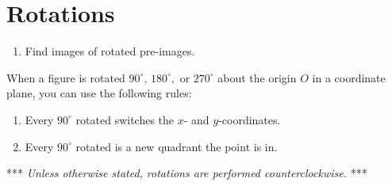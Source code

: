 \documentclass{article}
\begin{document}
\section*{Rotations}

\begin{tcolorbox}[colframe=orange!70!white, coltitle=black, title=\textbf{Today I Can}]
\begin{enumerate}
    \item Find images of rotated pre-images.
\end{enumerate}
\end{tcolorbox}
\bigskip

When a figure is rotated $90^\circ, \, 180^\circ, \text{ or } 270^\circ$ about the origin $O$ in a coordinate plane, you can use the following rules:

\begin{enumerate}
    \item Every $90^\circ$ rotated switches the $x$- and $y$-coordinates.    
    \item Every $90^\circ$ rotated is a new quadrant the point is in.
\end{enumerate}

\begin{center} 
\end{center}

*** \emph{Unless otherwise stated, rotations are performed counterclockwise.} *** \newline\\
\end{document}
